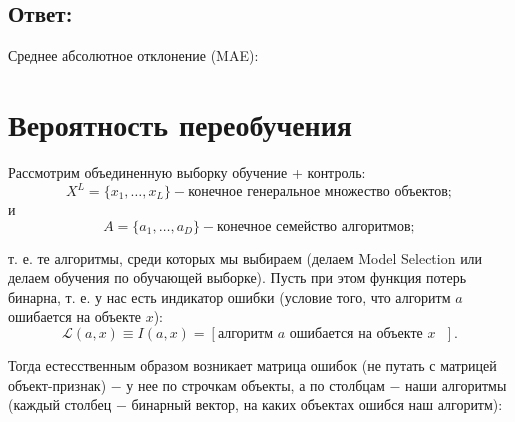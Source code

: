 \subsection*{Ответ:}
Среднее абсолютное отклонение (MAE): 


\section{Вероятность переобучения}

Рассмотрим объединенную выборку обучение + контроль:
\begin{equation*}
    X^L=\{ x_1, \dots , x_L \} - \text{конечное} \textit{ генеральное множество } \text{объектов};
\end{equation*}
и
\begin{equation*}
    A=\{ a_1, \dots , a_D \} - \text{конечное} \textit{ семейство алгоритмов};
\end{equation*}

т. е. те алгоритмы, среди которых мы выбираем (делаем Model \newline Selection или делаем обучения по обучающей выборке). Пусть при этом функция потерь бинарна, т. е. у нас есть индикатор ошибки (условие того, что алгоритм $a$ ошибается на объекте $x$):
\begin{equation*}
    \mathcal{L} ( a, x ) \equiv I ( a, x ) = [ \text{алгоритм $a$ ошибается на объекте $x$ } ].
\end{equation*}

Тогда естесственным образом возникает матрица ошибок (не путать с матрицей объект-признак) $-$ у нее по строчкам объекты, а по столбцам $-$ наши алгоритмы (каждый столбец $-$ бинарный вектор, на каких объектах ошибся наш алгоритм):

